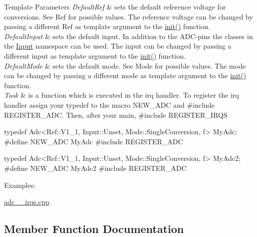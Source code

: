 \begin{DoxyTemplParams}{Template Parameters}
{\em Default\+Ref} & sets the default reference voltage for conversions. See Ref for possible values. The reference voltage can be changed by passing a different Ref as template argument to the \hyperlink{classadc_1_1Adc_ae453bb940554c62082776bd41a9053a3}{init()} function. \\
\hline
{\em Default\+Input} & sets the default input. In addition to the A\+D\+C-\/pins the classes in the \hyperlink{namespaceadc_1_1Input}{Input} namespace can be used. The input can be changed by passing a different input as template argument to the \hyperlink{classadc_1_1Adc_ae453bb940554c62082776bd41a9053a3}{init()} function. \\
\hline
{\em Default\+Mode} & sets the default mode. See Mode for possible values. The mode can be changed by passing a different mode as template argument to the \hyperlink{classadc_1_1Adc_ae453bb940554c62082776bd41a9053a3}{init()} function. \\
\hline
{\em Task} & is a function which is executed in the irq handler. To register the irq handler assign your typedef to the macro {\ttfamily N\+E\+W\+\_\+\+A\+DC} and {\ttfamily \#include R\+E\+G\+I\+S\+T\+E\+R\+\_\+\+A\+DC}. Then, after your main, {\ttfamily \#include R\+E\+G\+I\+S\+T\+E\+R\+\_\+\+I\+R\+QS}\\
\hline
\end{DoxyTemplParams}
\begin{DoxyVerb}typedef Adc<Ref::V1_1, Input::Unset, Mode::SingleConversion, f> MyAdc;
#define NEW_ADC MyAdc
#include REGISTER_ADC

typedef Adc<Ref::V1_1, Input::Unset, Mode::SingleConversion, f> MyAdc2;
#define NEW_ADC MyAdc2
#include REGISTER_ADC\end{DoxyVerb}
 \begin{Desc}
\item[Examples\+: ]\par
\hyperlink{adc_2_irqs_8cpp-example}{adc\+\_\+\_\+irqs.\+cpp}.\end{Desc}


\subsection{Member Function Documentation}
